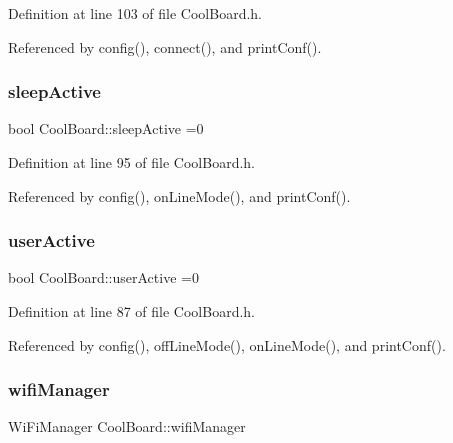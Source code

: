 Definition at line 103 of file Cool\+Board.\+h.



Referenced by config(), connect(), and print\+Conf().

\mbox{\label{classCoolBoard_a0a51b2287139f66c738101fb53139230}} 
\subsubsection{\texorpdfstring{sleep\+Active}{sleepActive}}
{\footnotesize\ttfamily bool Cool\+Board\+::sleep\+Active =0\hspace{0.3cm}{\ttfamily [private]}}



Definition at line 95 of file Cool\+Board.\+h.



Referenced by config(), on\+Line\+Mode(), and print\+Conf().

\mbox{\label{classCoolBoard_a6395459131d6889a3005f79c7a35e964}} 
\subsubsection{\texorpdfstring{user\+Active}{userActive}}
{\footnotesize\ttfamily bool Cool\+Board\+::user\+Active =0\hspace{0.3cm}{\ttfamily [private]}}



Definition at line 87 of file Cool\+Board.\+h.



Referenced by config(), off\+Line\+Mode(), on\+Line\+Mode(), and print\+Conf().

\mbox{\label{classCoolBoard_a55b28656e295140928557c47d7fff01e}} 
\subsubsection{\texorpdfstring{wifi\+Manager}{wifiManager}}
{\footnotesize\ttfamily Wi\+Fi\+Manager Cool\+Board\+::wifi\+Manager\hspace{0.3cm}{\ttfamily [private]}}



